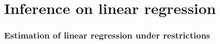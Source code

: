 

\part*{Inference on linear regression}%

\section{Estimation of linear regression under restrictions}


